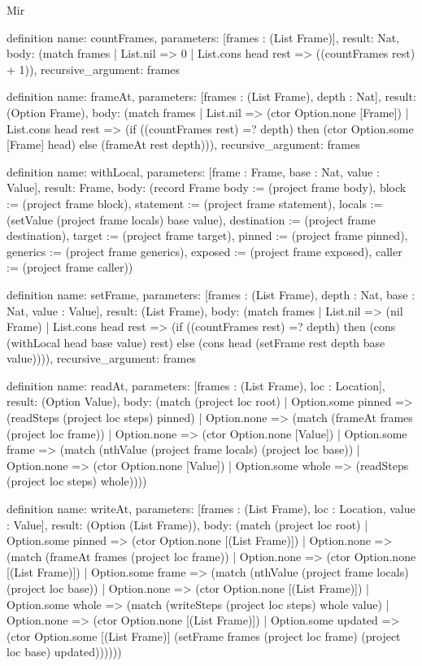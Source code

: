 \begin{lexlean}{Mir}
\begin{semanticmodule}
definition{
  name: countFrames,
  parameters: [frames : (List Frame)],
  result: Nat,
  body: (match frames | List.nil => 0 | List.cons head rest => ((countFrames rest) + 1)),
  recursive_argument: frames
}

definition{
  name: frameAt,
  parameters: [frames : (List Frame), depth : Nat],
  result: (Option Frame),
  body: (match frames
    | List.nil => (ctor Option.none [Frame])
    | List.cons head rest => (if ((countFrames rest) =? depth) then (ctor Option.some [Frame] head) else (frameAt rest depth))),
  recursive_argument: frames
}

definition{
  name: withLocal,
  parameters: [frame : Frame, base : Nat, value : Value],
  result: Frame,
  body: (record Frame {body := (project frame body), block := (project frame block), statement := (project frame statement), locals := (setValue (project frame locals) base value), destination := (project frame destination), target := (project frame target), pinned := (project frame pinned), generics := (project frame generics), exposed := (project frame exposed), caller := (project frame caller)})
}

definition{
  name: setFrame,
  parameters: [frames : (List Frame), depth : Nat, base : Nat, value : Value],
  result: (List Frame),
  body: (match frames
    | List.nil => (nil Frame)
    | List.cons head rest => (if ((countFrames rest) =? depth) then (cons (withLocal head base value) rest) else (cons head (setFrame rest depth base value)))),
  recursive_argument: frames
}

definition{
  name: readAt,
  parameters: [frames : (List Frame), loc : Location],
  result: (Option Value),
  body: (match (project loc root)
    | Option.some pinned => (readSteps (project loc steps) pinned)
    | Option.none => (match (frameAt frames (project loc frame))
      | Option.none => (ctor Option.none [Value])
      | Option.some frame => (match (nthValue (project frame locals) (project loc base))
        | Option.none => (ctor Option.none [Value])
        | Option.some whole => (readSteps (project loc steps) whole))))
}

definition{
  name: writeAt,
  parameters: [frames : (List Frame), loc : Location, value : Value],
  result: (Option (List Frame)),
  body: (match (project loc root)
    | Option.some pinned => (ctor Option.none [(List Frame)])
    | Option.none => (match (frameAt frames (project loc frame))
      | Option.none => (ctor Option.none [(List Frame)])
      | Option.some frame => (match (nthValue (project frame locals) (project loc base))
        | Option.none => (ctor Option.none [(List Frame)])
        | Option.some whole => (match (writeSteps (project loc steps) whole value)
          | Option.none => (ctor Option.none [(List Frame)])
          | Option.some updated => (ctor Option.some [(List Frame)] (setFrame frames (project loc frame) (project loc base) updated))))))
}


\end{semanticmodule}
\end{lexlean}
